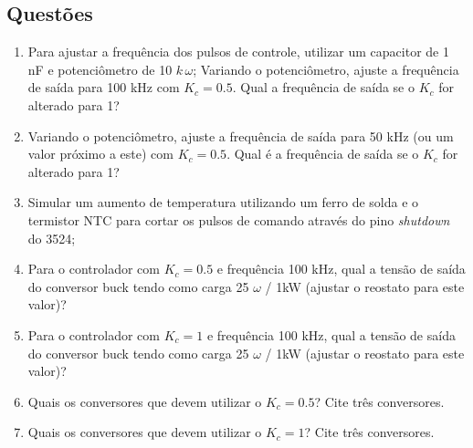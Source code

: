 \subsection{Questões}
\label{perguntas}

\begin{enumerate}
    \item Para ajustar a frequência dos pulsos de controle, utilizar um capacitor de 1 nF e potenciômetro de 10 $k \, \omega$; Variando o potenciômetro, ajuste a frequência de saída para 100 kHz com $K_c = 0.5$. Qual a frequência de saída se o $K_c$ for alterado para 1?
    
    \item Variando o potenciômetro, ajuste a frequência de saída para 50 kHz (ou um valor próximo a este) com $K_c = 0.5$. Qual é a frequência de saída se o $K_c$ for alterado para 1?
    
    \item Simular um aumento de temperatura utilizando um ferro de solda e o termistor NTC para cortar os pulsos de comando através do pino \textit{shutdown} do 3524;
    
    \item Para o controlador com $K_c = 0.5$ e frequência 100 kHz, qual a tensão de saída do conversor buck tendo como carga 25 $\omega$ / 1kW (ajustar o reostato para este valor)?
    
    \item Para o controlador com $K_c = 1$ e frequência 100 kHz, qual a tensão de saída do conversor buck tendo como carga 25 $\omega$ / 1kW (ajustar o reostato para este valor)?
    
    \item Quais os conversores que devem utilizar o $K_c = 0.5$? Cite três conversores.
    
    \item Quais os conversores que devem utilizar o $K_c = 1$? Cite três conversores.
    
\end{enumerate}